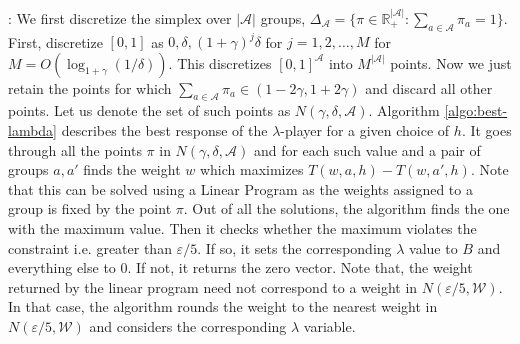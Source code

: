 \documentclass[11pt]{article}
\newcommand{\set}[1]{\{#1\}}
\newcommand{\bbR}{\mathbb{R}}
\newcommand{\WW}{\mathcal{W}}
\newcommand{\abs}[1]{\left|#1\right|}
\newcommand{\Ac}{\mathcal{A}}
\newcommand{\eps}{\varepsilon}
\begin{document}
: We first discretize the simplex over $\abs{\Ac}$ groups, $\Delta_{\Ac} = \set{\pi \in \bbR^{\abs{\Ac}}_+: \sum_{a \in \Ac} \pi_a = 1}$. First, discretize $[0,1]$ as $0,\delta, (1+\gamma)^j \delta$ for $j=1,2,\ldots,M$ for $M = O(\log_{1+\gamma}(1/\delta))$. This discretizes $[0,1]^{\Ac}$ into $M^{\abs{\Ac} }$ points. Now we just retain the points for which $\sum_{a\in \Ac} \pi_a \in (1-2\gamma,1+2\gamma)$ and discard all other points. Let us denote the set of such points as $N(\gamma,\delta,\Ac)$. Algorithm \ref{algo:best-lambda} describes the best response of the $\lambda$-player for a given choice of $h$. It goes through all the points $\pi$ in $N(\gamma,\delta,\Ac)$ and for each such value and a pair of groups $a,a'$ finds the weight $w$ which maximizes $T(w,a,h) - T(w,a',h)$. Note that this can be solved using a Linear Program as the weights assigned to a group is fixed by the point $\pi$. Out of all the solutions, the algorithm finds the one with the maximum value. Then it checks whether the maximum violates the constraint i.e. greater than $\eps / 5$. If so, it sets the corresponding $\lambda$ value to $B$ and everything else to $0$. If not, it returns the zero vector. Note that, the weight returned by the linear program need not correspond to a weight in $N(\eps/5, \WW)$. In that case, the algorithm rounds the weight to the nearest weight in $N(\eps/5,\WW)$ and considers the corresponding $\lambda$ variable.
\end{document}
